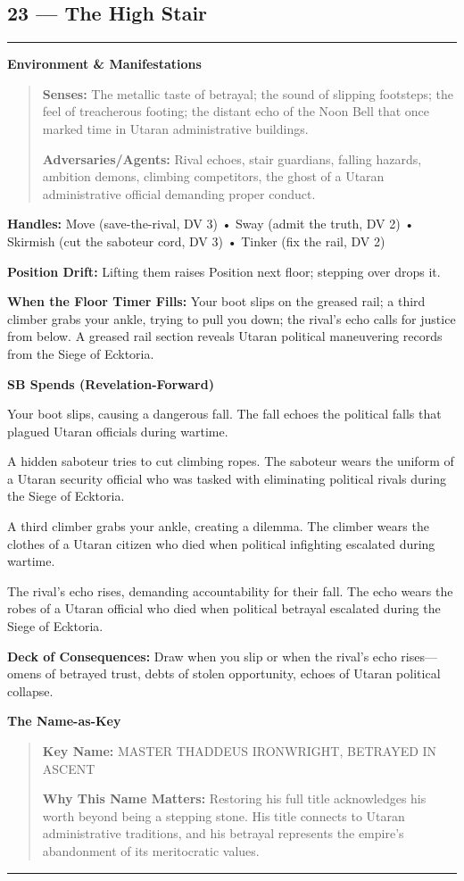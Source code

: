\documentclass[18pt, letterpaper, twoside]{article}
\newenvironment{floorbox}[1]{%
    \begin{center}
    \begin{minipage}{0.95\textwidth}
    \subsection*{#1}
    \vspace{-0.5em}
    \rule{\textwidth}{0.5pt}
    \vspace{0.5em}
}{%
    \vspace{0.5em}
    \rule{\textwidth}{0.5pt}
    \end{minipage}
    \end{center}
}
\newenvironment{gmnote}[1]{%
    \vspace{0.5em}
    \noindent\textbf{#1}
    \begin{quote}
}{%
    \end{quote}
    \vspace{0.5em}
}
\newcommand{\handles}[1]{\noindent\textbf{Handles:} #1\par}
\newcommand{\sbitem}[2]{\item[#1 SB:] #2}
\newcommand{\deckdraw}[1]{\noindent\textbf{Deck of Consequences:} #1\par}
\newcommand{\keyname}[1]{\noindent\textbf{Key Name:} #1\par}
\newcommand{\nameimportance}[1]{\noindent\textbf{Why This Name Matters:} #1\par}
\begin{document}
\begin{floorbox}{23 --- The High Stair}
\begin{gmnote}{Environment \& Manifestations}
\textbf{Senses:} The metallic taste of betrayal; the sound of slipping footsteps; the feel of treacherous footing; the distant echo of the Noon Bell that once marked time in Utaran administrative buildings.

\textbf{Adversaries/Agents:} Rival echoes, stair guardians, falling hazards, ambition demons, climbing competitors, the ghost of a Utaran administrative official demanding proper conduct.
\end{gmnote}

\handles{Move (save-the-rival, DV 3) • Sway (admit the truth, DV 2) • Skirmish (cut the saboteur cord, DV 3) • Tinker (fix the rail, DV 2)}

\textbf{Position Drift:} Lifting them raises Position next floor; stepping over drops it.

\textbf{When the Floor Timer Fills:} Your boot slips on the greased rail; a third climber grabs your ankle, trying to pull you down; the rival's echo calls for justice from below. A greased rail section reveals Utaran political maneuvering records from the Siege of Ecktoria.

\textbf{SB Spends (Revelation-Forward)}
\begin{description}[leftmargin=*, style=unboxed]
    \sbitem{1}{Your boot slips, causing a dangerous fall. The fall echoes the political falls that plagued Utaran officials during wartime.}
    \sbitem{2}{A hidden saboteur tries to cut climbing ropes. The saboteur wears the uniform of a Utaran security official who was tasked with eliminating political rivals during the Siege of Ecktoria.}
    \sbitem{3}{A third climber grabs your ankle, creating a dilemma. The climber wears the clothes of a Utaran citizen who died when political infighting escalated during wartime.}
    \sbitem{4+}{The rival's echo rises, demanding accountability for their fall. The echo wears the robes of a Utaran official who died when political betrayal escalated during the Siege of Ecktoria.}
\end{description}

\deckdraw{Draw when you slip or when the rival's echo rises---omens of betrayed trust, debts of stolen opportunity, echoes of Utaran political collapse.}

\begin{gmnote}{The Name-as-Key}
\keyname{MASTER THADDEUS IRONWRIGHT, BETRAYED IN ASCENT}
\nameimportance{Restoring his full title acknowledges his worth beyond being a stepping stone. His title connects to Utaran administrative traditions, and his betrayal represents the empire's abandonment of its meritocratic values.}


\end{gmnote}
\end{floorbox}
\end{document}
